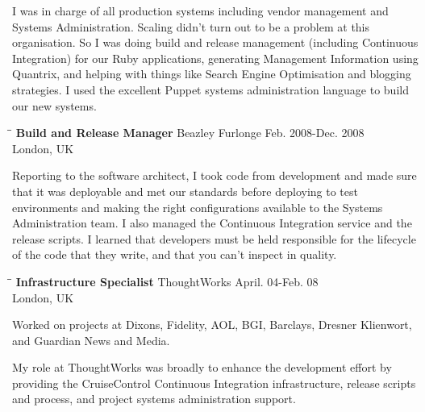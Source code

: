 \documentclass{res}
\begin{document}
\begin{resume}
\begin{tabbing}
   \end{tabbing}\vspace{-20pt}      %
    I was in charge of all production systems including vendor management and Systems Administration.  Scaling didn't turn out to be a problem at this organisation.  So I was doing build and release management (including Continuous Integration) for our Ruby applications, generating Management Information using Quantrix, and helping with things like Search Engine Optimisation and blogging strategies. I used the excellent Puppet systems administration language to build our new systems. 
   \begin{tabbing}
   \hspace{2.3in}\= \hspace{2.6in}\= \kill %
     {\bf Build and Release Manager} \>Beazley Furlonge     \>Feb. 2008-Dec. 2008\\ 
                          \>London, UK
   \end{tabbing}\vspace{-20pt}

Reporting to the software architect, I took code from development and made sure that it was deployable and met our standards before deploying to test environments and making the right configurations available to the Systems Administration team.  I also managed the Continuous Integration service and the release scripts.  I learned that developers must be held responsible for the lifecycle of the code that they write, and that you can't inspect in quality.

   \begin{tabbing}
   \hspace{2.3in}\= \hspace{2.6in}\= \kill %
    {\bf Infrastructure Specialist} \>ThoughtWorks \> April. 04-Feb. 08\\
                          \>London, UK
   \end{tabbing}\vspace{-20pt}
	Worked on projects at Dixons, Fidelity, AOL, BGI, Barclays, Dresner Klienwort, and Guardian News and Media.
	
     My role at ThoughtWorks was broadly to enhance the development effort by providing the CruiseControl Continuous Integration infrastructure, release scripts and process, and project systems administration support.


\end{resume}
\end{document}
